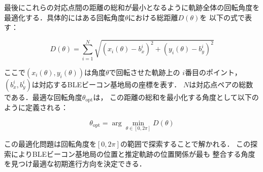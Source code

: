 最後にこれらの対応点間の距離の総和が最小となるように軌跡全体の回転角度を
最適化する．具体的にはある回転角度$\theta$における総距離$D(\theta)$を
以下の式で表す：

\begin{equation}
D(\theta) = \sum_{i=1}^{N} \sqrt{(x_i(\theta) - b_x^i)^2 + (y_i(\theta) - b_y^i)^2}
\end{equation}

ここで$(x_i(\theta), y_i(\theta))$は角度$\theta$で回転させた軌跡上の
$i$番目のポイント，$(b_x^i, b_y^i)$は対応するBLEビーコン基地局の座標を表す．
$N$は対応点ペアの総数である．最適な回転角度$\theta_{\mathrm{opt}}$は，
この距離の総和を最小化する角度として以下のように定義される：

\begin{equation}
\theta_{\mathrm{opt}} = \arg\min_{\theta \in [0, 2\pi]} D(\theta)
\end{equation}

この最適化問題は回転角度を$[0, 2\pi]$の範囲で探索することで解かれる．
この探索によりBLEビーコン基地局の位置と推定軌跡の位置関係が最も
整合する角度を見つけ最適な初期進行方向を決定できる．



